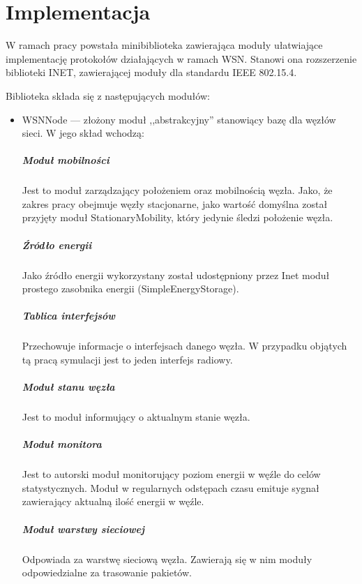 \chapter{Implementacja}
W ramach pracy powstała minibiblioteka zawierająca moduły ułatwiające implementację protokołów działających w ramach WSN. Stanowi ona rozszerzenie biblioteki INET, zawierającej moduły dla standardu IEEE 802.15.4.

Biblioteka składa się z następujących modułów:
\begin{itemize}
	\item WSNNode --- złożony moduł ,,abstrakcyjny'' stanowiący bazę dla węzłów sieci. W jego skład wchodzą:
\paragraph{Moduł mobilności} Jest to moduł zarządzający położeniem oraz mobilnością węzła. Jako, że zakres pracy obejmuje węzły stacjonarne, jako wartość domyślna został przyjęty moduł StationaryMobility, który jedynie śledzi położenie węzła.
\paragraph{Źródło energii} Jako źródło energii wykorzystany został udostępniony przez Inet moduł prostego zasobnika energii (SimpleEnergyStorage).
\paragraph{Tablica interfejsów} Przechowuje informacje o interfejsach danego węzła. W przypadku objątych tą pracą symulacji jest to jeden interfejs radiowy.
\paragraph{Moduł stanu węzła} Jest to moduł informujący o aktualnym stanie węzła.
\paragraph{Moduł monitora} Jest to autorski moduł monitorujący poziom energii w węźle do celów statystycznych. Moduł w regularnych odstępach czasu emituje sygnał zawierający aktualną ilość energii w węźle.
\paragraph{Moduł warstwy sieciowej} Odpowiada za warstwę sieciową węzła. Zawierają się w nim moduły odpowiedzialne za trasowanie pakietów.

\end{itemize}
